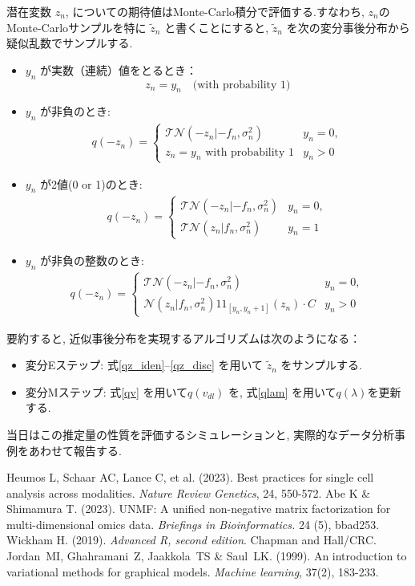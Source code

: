 \documentclass[a4paper,12ptc]{jsarticle} %
\newcommand{\one}{1\!\!1}
\begin{document}
潜在変数 $z_n$, についての期待値はMonte-Carlo積分で評価する.すなわち, $z_n$のMonte-Carloサンプルを特に $\tilde z_n$ と書くことにすると, $\tilde z_n$ を次の変分事後分布から疑似乱数でサンプルする. 
\begin{itemize}
\item $y_n$ が実数（連続）値をとるとき： 
\begin{equation}
z_n=y_n \quad \mbox{(with probability 1)}  \label{qz_iden}
\end{equation}
\item $y_n$ が非負のとき:
\begin{align}
q(-z_n) = \begin{cases}
    \mathcal{TN}(-z_n|-f_n, \sigma_n^2) & y_n=0,\\
    z_n = y_n \mbox{~with probability 1} & y_n>0
\end{cases} \label{qz_rect}
\end{align}
\item $y_n$ が2値(0 or 1)のとき:
\begin{align}
q(-z_n) = \begin{cases}
    \mathcal{TN}(-z_n|-f_n, \sigma_n^2) & y_n=0,\\
    \mathcal{TN}(z_n|f_n, \sigma_n^2) & y_n=1
\end{cases}\label{qz_binary}
\end{align}
\item $y_n$ が非負の整数のとき:
\begin{align}
q(-z_n) = \begin{cases}
    \mathcal{TN}(-z_n|-f_n, \sigma_n^2) & y_n=0,\\
    \mathcal{N}(z_n|f_n, \sigma_n^2) \one_{[y_n,y_n+1]}(z_n) \cdot C & y_n > 0
\end{cases}\label{qz_disc}
\end{align}
\end{itemize}

要約すると, 近似事後分布を実現するアルゴリズムは次のようになる：
\begin{itemize}
\item 変分Eステップ: 式\ref{qz_iden}--\ref{qz_disc} を用いて $\tilde{z}_n$ をサンプルする.
\item 変分Mステップ:  式\ref{qv} を用いて$q(v_{dl})$ を, 式\ref{qlam} を用いて$q(\lambda)$を更新する. 
\end{itemize}

当日はこの推定量の性質を評価するシミュレーションと, 実際的なデータ分析事例をあわせて報告する.

\begin{thebibliography}{9}
 Heumos L, Schaar AC, Lance C, et al. (2023). Best practices for single cell analysis across modalities. {\em Nature Review Genetics}, 24, 550-572.
 Abe K \& Shimamura T. (2023). UNMF: A unified non-negative matrix factorization for multi-dimensional omics data. {\em Briefings in Bioinformatics.}  24 (5), bbad253.
 Wickham H. (2019).  {\em Advanced R, second edition}. Chapman and Hall/CRC.
 Jordan~MI, Ghahramani~Z, Jaakkola~TS \& Saul~LK. (1999). An introduction to variational methods for graphical models. {\em Machine learning}, 37(2), 183-233.
\end{thebibliography}
\end{document}
